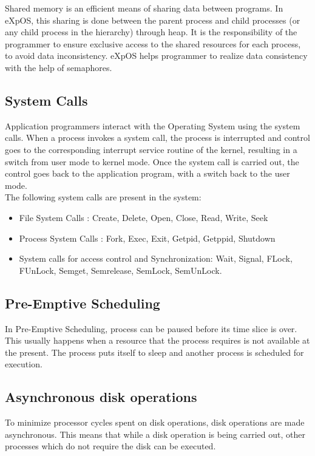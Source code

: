 \documentclass[11pt ,twosided]{article}
\begin{document}
Shared memory is an efficient means of sharing data between programs. In eXpOS, this sharing is done between the parent process and child processes (or any child process in the hierarchy) through heap. It is the responsibility of the programmer to ensure exclusive access to the shared resources for each process, to avoid data inconsistency. eXpOS helps programmer to realize data consistency with the help of semaphores. 
\subsection{System Calls}

Application programmers interact with the Operating System using the system calls. When a process invokes a system call, the process is interrupted and control goes to the corresponding interrupt service routine of the kernel, resulting in a switch from user mode to kernel mode. Once the system call is carried out, the control goes back to the application program, with a switch back to the user mode.\\
The following system calls are present in the system: 
\begin{itemize}
\item File System Calls : Create, Delete, Open, Close, Read, Write, Seek
\item Process System Calls : Fork, Exec, Exit, Getpid, Getppid, Shutdown
\item System calls for access control and Synchronization: Wait, Signal, FLock, FUnLock, Semget, Semrelease, SemLock, SemUnLock.
\end{itemize}

\subsection{Pre-Emptive Scheduling}

In Pre-Emptive Scheduling, process can be paused before its time slice is over. This usually happens when a resource that the process requires is not available at the present. The process puts itself to sleep and another process is scheduled for execution.
\subsection{Asynchronous disk operations}

To minimize processor cycles spent on disk operations, disk operations are made asynchronous. This means that while a disk operation is being carried out, other processes which do not require the disk can be executed.
\end{document}
